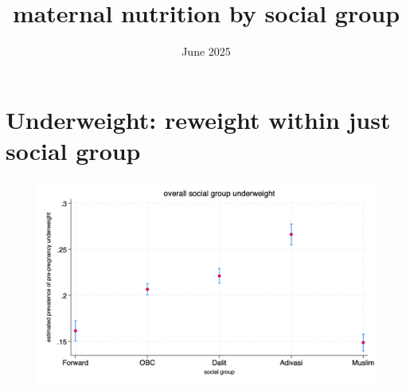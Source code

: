\documentclass{article}
\title{maternal nutrition by social group}
\date{June 2025}
\begin{document}
\maketitle


\section{Underweight: reweight within \textbf{just social group} }

\begin{figure}[H]
    \centering
    \includegraphics[width=\textwidth]{figures/overall_graph.png}
\end{figure}









\end{document}
